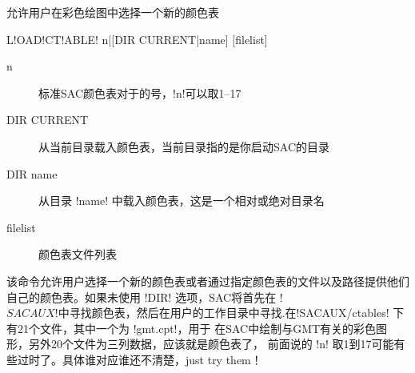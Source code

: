 \label{cmd:loadctable}

允许用户在彩色绘图中选择一个新的颜色表

\begin{SACSTX}
L!OAD!CT!ABLE! n|[DIR CURRENT|name] [filelist]
\end{SACSTX}

\begin{description}
\item [n] 标准SAC颜色表对于的号，!n!可以取1--17
\item [DIR CURRENT] 从当前目录载入颜色表，当前目录指的是你启动SAC的目录
\item [DIR name] 从目录 !name! 中载入颜色表，这是一个相对或绝对目录名
\item [filelist] 颜色表文件列表
\end{description}

该命令允许用户选择一个新的颜色表或者通过指定颜色表的文件以及路径提供他们
自己的颜色表。如果未使用 !DIR! 选项，SAC将首先在 !$SACAUX! 中
寻找颜色表，然后在用户的工作目录中寻找.

在 !$SACAUX/ctables! 下有21个文件，其中一个为 !gmt.cpt!，用于
在SAC中绘制与GMT有关的彩色图形，另外20个文件为三列数据，应该就是颜色表了，
前面说的 !n! 取1到17可能有些过时了。具体谁对应谁还不清楚，just try them！
